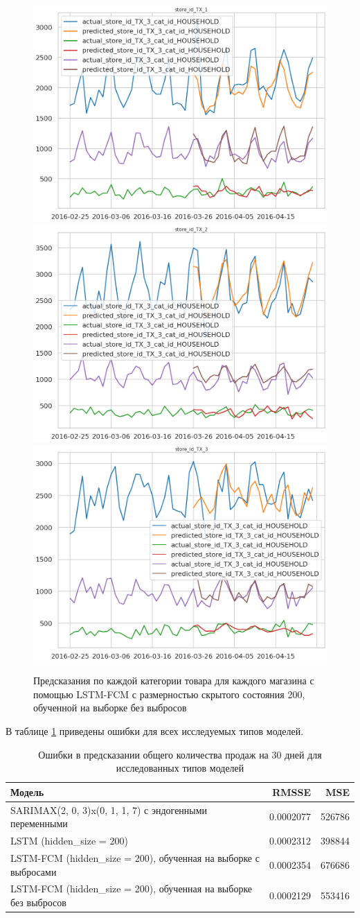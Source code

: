 \def\figurename{Рис}
\begin{figure}[t]
	\centering
	\includegraphics[width=0.25\columnwidth]{./img/fcm_lstm_tx1_110_days.png}
	\includegraphics[width=0.25\columnwidth]{./img/fcm_lstm_tx2_110_days.png}
	\includegraphics[width=0.25\columnwidth]{./img/fcm_lstm_tx3_110_days.png}
	\caption{Предсказания по каждой категории товара для каждого магазина с помощью LSTM-FCM с размерностью скрытого состояния 200, обученной на выборке без выбросов}
	\label{img:prediction_fcm_lstm_110d}
\end{figure}


В таблице \ref{tbl:all_models_comparation} приведены ошибки для всех исследуемых типов моделей.

\begin{table}
    \caption{ Ошибки в предсказании общего количества продаж на 30 дней для исследованных типов моделей }
    \centering
    \begin{tabular}{|l|r||r|}
        \hline
            Модель                                                            & RMSSE     & MSE    \\
        \hline
            SARIMAX(2, 0, 3)x(0, 1, 1, 7) с эндогенными переменными           & 0.0002077 & 526786 \\
            LSTM (hidden\_size = 200)                                         & 0.0002312 & 398844 \\
            LSTM-FCM (hidden\_size = 200), обученная на выборке с выбросами   & 0.0002354 & 676686 \\
            LSTM-FCM (hidden\_size = 200), обученная на выборке без выбросов  & 0.0002129 & 553416 \\
        \hline
    \end{tabular}
    \label{tbl:all_models_comparation}
\end{table}

